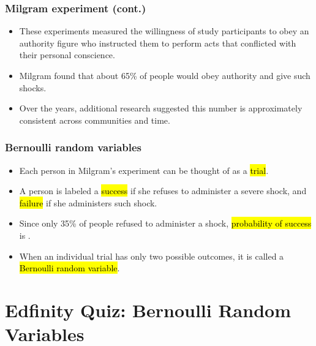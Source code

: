 \documentclass[slidestop,compress,mathserif]{beamer}
\begin{document}

\begin{frame}
\frametitle{Milgram experiment (cont.)}

\begin{itemize}

\item These experiments measured the willingness of study participants to obey an authority figure who instructed them to perform acts that conflicted with their personal conscience.

\item Milgram found that about 65\% of people would obey authority and give such shocks.

\item Over the years, additional research suggested this number is approximately consistent across communities and time.

\end{itemize}

\end{frame}



\begin{frame}
\frametitle{Bernoulli random variables}

\begin{itemize}

\item Each person in Milgram's experiment can be thought of as a \hl{trial}.

\item A person is labeled a \hl{success} if she refuses to administer a severe shock, and \hl{failure} if she administers such shock.

\item Since only 35\% of people refused to administer a shock, \hl{probability of success} is .

\item When an individual trial has only two possible outcomes, it is called a \hl{Bernoulli random variable}.

\end{itemize}

\end{frame}


\section{Edfinity Quiz: Bernoulli Random Variables}
\end{document}
